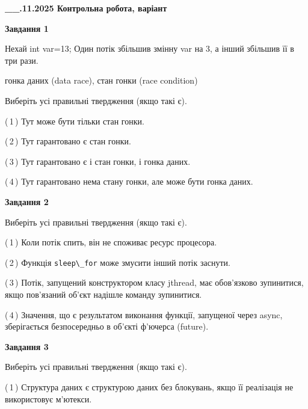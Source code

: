 \documentclass[12pt, ukrainian]{article}
\def\code#1{\Verb!#1!}
\begin{document}
\begin {large}

\textbf{\_\_.11.2025 Контрольна робота, варіант  }\par


{

\begin{center}
\textbf{Завдання 1}
\end{center}
Нехай int var=13; Один потік збільшив змінну var на 3, а інший збільшив її в три рази.

гонка даних (data race), стан гонки (race condition)

Виберіть усі правильні твердження (якщо такі є).\par
\vspace{2mm}
(\,1\,) Тут може бути тільки стан гонки.%

(\,2\,) Тут гарантовано є стан гонки.%

(\,3\,) Тут гарантовано є і стан гонки, і гонка даних.%

(\,4\,) Тут гарантовано нема стану гонки, але може бути гонка даних.%



\begin{center}
\textbf{Завдання 2}
\end{center}
Виберіть усі правильні твердження (якщо такі є).\par
\vspace{2mm}

(\,1\,) Коли потік спить, він не споживає ресурс процесора.%

(\,2\,) Функція \code{sleep\_for} може змусити інший потік заснути.%

(\,3\,) Потік, запущений конструктором класу jthread, має обов’язково зупинитися, якщо пов’язаний об’єкт надішле команду зупинитися.%

(\,4\,) Значення, що є результатом виконання функції, запущеної через async, зберігається безпосередньо в об’єкті ф’ючерса (future).%



\begin{center}
\textbf{Завдання 3}
\end{center}
Виберіть усі правильні твердження (якщо такі є).\par
\vspace{2mm}

(\,1\,) Структура даних є структурою даних без блокувань, якщо її реалізація не використовує м’ютекси.%

}
\end{large}
\end{document}
